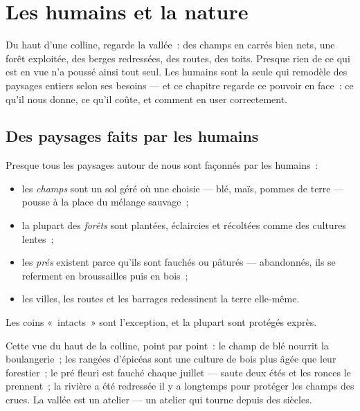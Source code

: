 \chapter{Les humains et la nature}\label{ch:g5:people-and-nature}

Du haut d'une colline, regarde la vallée~: des champs en carrés bien
nets, une forêt exploitée, des berges redressées, des routes, des
toits. Presque rien de ce qui est en vue n'a poussé ainsi tout seul.
Les humains sont la seule  qui remodèle des paysages entiers
selon ses besoins --- et ce chapitre regarde ce pouvoir en face~: ce
qu'il nous donne, ce qu'il coûte, et comment en user correctement.

\section{Des paysages faits par les humains}

\begin{proposition}\label{prop:g5:people-and-nature:managed}
Presque tous les paysages autour de nous sont façonnés par les
humains~:
\begin{itemize}
  \item les \emph{champs} sont un sol géré où une
         choisie --- blé, maïs, pommes de terre --- pousse à
        la place du mélange sauvage~;
  \item la plupart des \emph{forêts} sont
        plantées, éclaircies et récoltées comme des cultures
        lentes~;
  \item les \emph{prés} existent parce qu'ils sont fauchés ou
        pâturés --- abandonnés, ils se referment en broussailles
        puis en bois~;
  \item les villes, les routes et les barrages redessinent la terre
        elle-même.
\end{itemize}
Les coins «~intacts~» sont l'exception, et la plupart sont protégés
exprès.
\end{proposition}
\admitted

\begin{example}\label{ex:g5:people-and-nature:valley}
Cette vue du haut de la colline, point par point~: le champ de blé
nourrit la boulangerie~; les rangées d'épicéas sont une culture de
bois plus âgée que leur forestier~; le pré fleuri est fauché chaque
juillet --- saute deux étés et les ronces le prennent~; la rivière a
été redressée il y a longtemps pour protéger les champs des crues.
La vallée est un atelier --- un atelier qui tourne depuis des
siècles.
\end{example}

